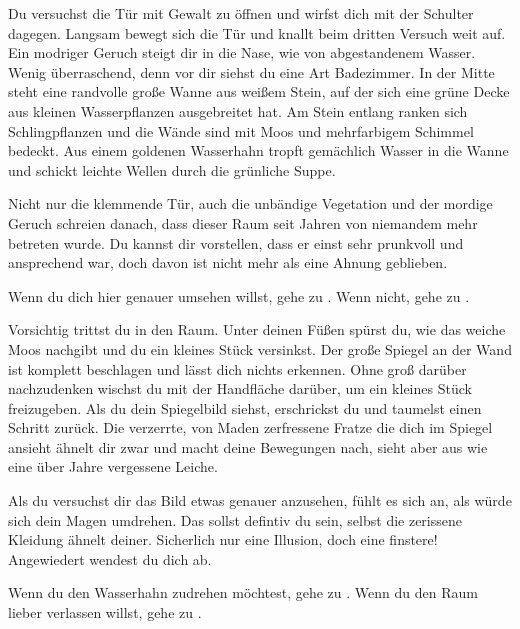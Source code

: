 
Du versuchst die Tür mit Gewalt zu öffnen und wirfst dich mit der Schulter dagegen. Langsam bewegt sich die Tür und knallt beim dritten Versuch weit auf. Ein modriger Geruch steigt dir in die Nase, wie von abgestandenem Wasser. Wenig überraschend, denn vor dir siehst du eine Art Badezimmer. In der Mitte steht eine randvolle große Wanne aus weißem Stein, auf der sich eine grüne Decke aus kleinen Wasserpflanzen ausgebreitet hat. Am Stein entlang ranken sich Schlingpflanzen und die Wände sind mit Moos und mehrfarbigem Schimmel bedeckt. Aus einem goldenen Wasserhahn tropft gemächlich Wasser in die Wanne und schickt leichte Wellen durch die grünliche Suppe.

Nicht nur die klemmende Tür, auch die unbändige Vegetation und der mordige Geruch schreien danach, dass dieser Raum seit Jahren von niemandem mehr betreten wurde. Du kannst dir vorstellen, dass er einst sehr prunkvoll und ansprechend war, doch davon ist nicht mehr als eine Ahnung geblieben.

Wenn du dich hier genauer umsehen willst, gehe zu .
Wenn nicht, gehe zu .


Vorsichtig trittst du in den Raum. Unter deinen Füßen spürst du, wie das weiche Moos nachgibt und du ein kleines Stück versinkst. Der große Spiegel an der Wand ist komplett beschlagen und lässt dich nichts erkennen. Ohne groß darüber nachzudenken wischst du mit der Handfläche darüber, um ein kleines Stück freizugeben. Als du dein Spiegelbild siehst, erschrickst du und taumelst einen Schritt zurück. Die verzerrte, von Maden zerfressene Fratze die dich im Spiegel ansieht ähnelt dir zwar und macht deine Bewegungen nach, sieht aber aus wie eine über Jahre vergessene Leiche.

Als du versuchst dir das Bild etwas genauer anzusehen, fühlt es sich an, als würde sich dein Magen umdrehen. Das sollst defintiv du sein, selbst die zerissene Kleidung ähnelt deiner. Sicherlich nur eine Illusion, doch eine finstere! Angewiedert wendest du dich ab.

Wenn du den Wasserhahn zudrehen möchtest, gehe zu .
Wenn du den Raum lieber verlassen willst, gehe zu .



